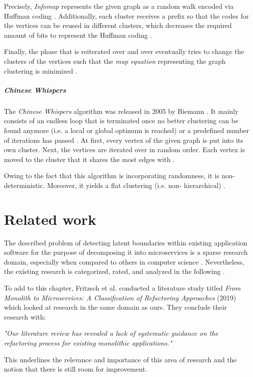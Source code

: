 \documentclass[12pt,a4paper]{report}
\begin{document}
Precisely, \textit{Infomap} represents the given graph as a random walk encoded
via Huffman coding \cite{huffman1952coding}. Additionally, each cluster
receives a prefix so that the codes for the vertices can be reused in different
clusters, which decreases the required amount of bits to represent the Huffman
coding \cite{rosvall2008infomap}.

Finally, the phase that is reiterated over and over eventually tries to change
the clusters of the vertices such that the \textit{map equation} representing
the graph clustering is minimized \cite{rosvall2008infomap}.

\paragraph{Chinese Whispers \cite{biemann2006chinese}}
The \textit{Chinese Whispers} algorithm was released in 2005 by Biemann
\cite{biemann2006chinese}.
It mainly consists of an endless loop that is terminated once no better
clustering can be found anymore (i.e. a local or global optimum is reached) or
a predefined number of iterations has passed \cite{biemann2006chinese}. At
first, every vertex of the given graph is put into its own cluster. Next, the
vertices are iterated over in random order. Each vertex is moved to the cluster
that it shares the most edges with \cite{biemann2006chinese}.

Owing to the fact that this algorithm is incorporating randomness, it is
non\hyp deterministic. Moreover, it yields a flat clustering (i.e. non\hyp
hierarchical) \cite{biemann2006chinese}.




\chapter{Related work} \label{chap:related}

The described problem of detecting latent boundaries within existing
application software for the purpose of decomposing it into microservices is a
sparse research domain, especially when compared to others in computer science
\cite{fritzsch2018monolith}. Nevertheless, the existing research is
categorized, rated, and analyzed in the following
\textit{}.

To add to this chapter, Fritzsch et al. conducted a literature study titled
\textit{From Monolith to Microservices: A Classification of Refactoring
Approaches} (2019) \cite{fritzsch2018monolith} which looked at research in the
same domain as ours. They conclude their research with:
\begin{displayquote}
  \emph{
  "Our literature review has revealed a lack of systematic guidance on the
  refactoring process for existing monolithic applications."
  }~\cite{fritzsch2018monolith}
\end{displayquote}
This underlines the relevance and importance of this area of research
and the notion that there is still room for improvement.
\newpage
\end{document}
